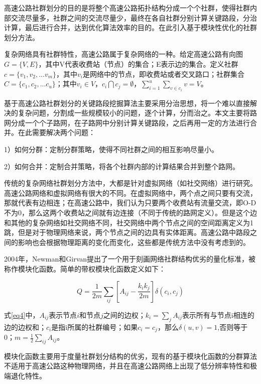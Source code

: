 				高速公路社群划分的目的是将整个高速公路拓扑结构分成一个个社群，使得社群内部交流尽量多，社群之间的交流尽量少，最终在各自社群分别计算关键路段，分治计算，最后进行合并，达到优化算法效率的目的。在此引入基于模块性优化的社群划分方法。

				复杂网络具有社群特性，高速公路属于复杂网络的一种。给定高速公路有向图$G=\{V,E\}$，其中V代表收费站（节点）的集合；E表示边的集合。定义社群$c=\{v_1,v_2,...v_m\}$，其中$v_i$是网络中的节点，即收费站或者交叉路口；社群集合$C=\{c_1,c_2,...c_u\}$；其中$v_i \in V$，${c_i}\bigcap {{c_j}}  = \emptyset$，$\sum\limits_{i = 1}^u {\sum\limits_{v \in {c_i}} v  = V}$。

				基于高速公路社群划分的关键路段挖掘算法主要采用分治思想，将一个难以直接解决的复杂问题，分割成一些规模较小的问题，逐个计算，分而治之。本文主要将路网分成一个个子路网，在子路网中分别计算关键路段，之后再用一定的方法进行合并。在此需要解决两个问题：

					1）如何分群：定制分群策略，使得不同社群之间的相互影响尽量小。

					2）如何合并：定制合并策略，将各个社群内部的计算结果合并到整个路网。

				传统的复杂网络社群划分方法中，大都是针对虚拟网络（如社交网络）进行研究。高速公路网络和虚拟网络有很大的不同。在虚拟网络中，两个点之间只要有交流，那就代表有边相连；在高速公路中，我们认为只要两个收费站有流量交流，即O-D不为0，那么这两个收费站之间就有边连接（不同于传统的路网定义）。但是这个边和其他的复杂网络如社交网络不同，社交网络中两个节点之间的空间距离定义为1跳，但是对于物理网络来说，两个节点之间的边具有实体距离。高速公路中路段之间的影响也会根据物理距离的变化而变化，这些都是传统方法中没有考虑到的。

				2004年，Newman和Girvan\parencite{NewmanBasic}提出了一个用于刻画网络社群结构优劣的量化标准，被称作模块化函数。简单的带权模块化函数定义如下：

				\begin{equation}
				Q = \frac{1}{{2m}}\sum\limits_{ij} {[{A_{ij}} - \frac{{{k_i}{k_j}}}{{2m}}]\delta ({c_i},{c_j})}
				\label{eq4}
				\end{equation}

				式\ref{eq4}中，$A_{ij}$表示节点$i$和节点$j$之间的边权；$k_i=\sum\limits_{j} {A_{ij}}$表示所有与节点i相连的边的边权和；$c_i$是指i所属的社群编号；如果$c_i=c_j$，那么$\delta (u,v)=1$,否则等于0；$m=\frac{1}{{2}}\sum\limits_{ij} {A_{ij}}$。

				模块化函数主要用于度量社群划分结构的优劣，现有的基于模块化函数的分群算法不适用于高速公路这种物理网络，并且在高速公路网络上出现了低分辨率特性和极端退化特性\parencite{Ren2014The}。
